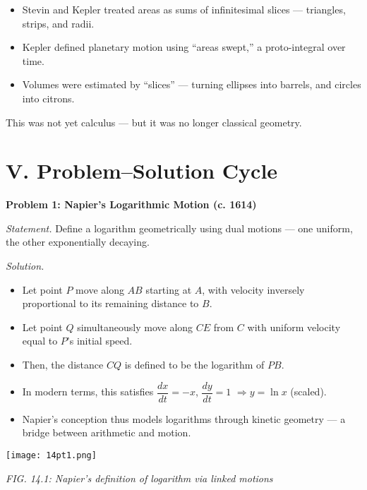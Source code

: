 \documentclass[9pt]{article}
\begin{document}
\begin{itemize}
    \item Stevin and Kepler treated areas as sums of infinitesimal slices — triangles, strips, and radii.
    \item Kepler defined planetary motion using “areas swept,” a proto-integral over time.
    \item Volumes were estimated by “slices” — turning ellipses into barrels, and circles into citrons.
\end{itemize}

This was not yet calculus — but it was no longer classical geometry.







\newpage



\section*{V. Problem–Solution Cycle}

\textbf{Problem 1: Napier’s Logarithmic Motion (c. 1614)}

\textit{Statement.} Define a logarithm geometrically using dual motions — one uniform, the other exponentially decaying.

\textit{Solution.}
\begin{itemize}
    \item Let point $P$ move along $AB$ starting at $A$, with velocity inversely proportional to its remaining distance to $B$.
    \item Let point $Q$ simultaneously move along $CE$ from $C$ with uniform velocity equal to $P$’s initial speed.
    \item Then, the distance $CQ$ is defined to be the logarithm of $PB$.
    \item In modern terms, this satisfies $\dfrac{dx}{dt} = -x$, $\dfrac{dy}{dt} = 1$ $\Rightarrow y = \ln x$ (scaled).
    \item Napier’s conception thus models logarithms through kinetic geometry — a bridge between arithmetic and motion.
\end{itemize}

\begin{center}
    \texttt{[image: 14pt1.png]}

    \textit{FIG. 14.1: Napier’s definition of logarithm via linked motions}
\end{center}
\end{document}
